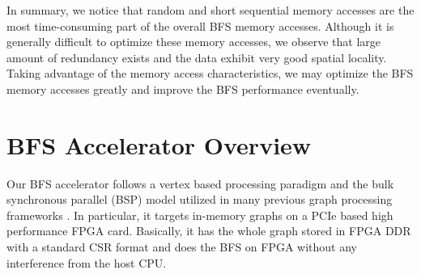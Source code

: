 %

In summary, we notice that random and short sequential memory accesses 
are the most time-consuming part of the overall BFS memory accesses. 
Although it is generally difficult to optimize these memory accesses, 
we observe that large amount of redundancy exists and 
the data exhibit very good spatial locality. Taking advantage of the 
memory access characteristics, we may optimize the BFS memory accesses 
greatly and improve the BFS performance eventually.

\section{BFS Accelerator Overview} \label{sec:overview}
Our BFS accelerator follows a vertex based processing paradigm 
and the bulk synchronous parallel (BSP) model utilized in many previous 
graph processing frameworks \cite{malewicz2010pregel}. In particular, 
it targets in-memory graphs on a PCIe based high performance FPGA card. 
Basically, it has the whole graph stored in FPGA DDR with a standard 
CSR format and does the BFS on FPGA without any interference from the host CPU. 


